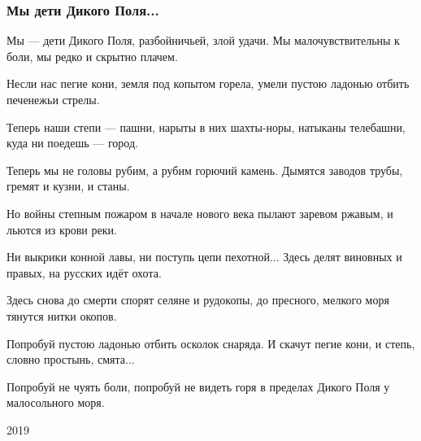  
 
 

\subsubsection{Мы дети Дикого Поля...}
\label{sec:poetry.rus.dnr.vladislav_rusanov.deti_dikogo_polja}

Мы --- дети Дикого Поля,
разбойничьей, злой удачи.
Мы малочувствительны к боли,
мы редко и скрытно плачем.

Несли нас пегие кони,
земля под копытом горела,
умели пустою ладонью
отбить печенежьи стрелы.

Теперь наши степи --- пашни,
нарыты в них шахты-норы,
натыканы телебашни,
куда ни поедешь --- город.

Теперь мы не головы рубим,
а рубим горючий камень.
Дымятся заводов трубы,
гремят и кузни, и станы.

Но войны степным пожаром
в начале нового века
пылают заревом ржавым,
и льются из крови реки.

Ни выкрики конной лавы,
ни поступь цепи пехотной...
Здесь делят виновных и правых,
на русских идёт охота.

Здесь снова до смерти спорят
селяне и рудокопы,
до пресного, мелкого моря
тянутся нитки окопов.

Попробуй пустою ладонью
отбить осколок снаряда.
И скачут пегие кони,
и степь, словно простынь, смята...

Попробуй не чуять боли,
попробуй не видеть горя
в пределах Дикого Поля
у малосольного моря.

2019
